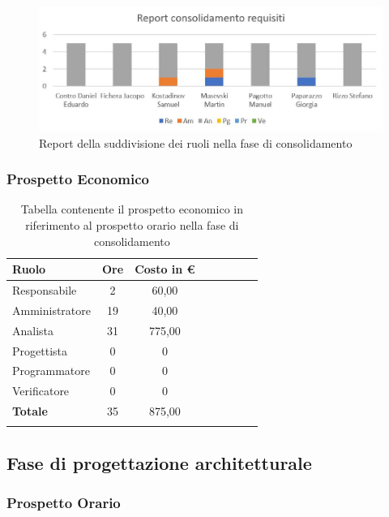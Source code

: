 \documentclass[../piano_di_progetto.tex]{subfiles}
\begin{document}
\begin{figure}[H]
\centering
\includegraphics[width=12cm]{img/report_consolidamento}
\caption{Report della suddivisione dei ruoli nella fase di consolidamento}
\end{figure}

\subsubsection{Prospetto Economico}

\begin{longtable}{|l|c|c|c|c|c|c|c|}
	\hline
	\rowcolor{lightgray}
	\textbf{Ruolo} & \textbf{Ore} & \textbf{Costo in €}\\
	\endhead
	\hline
	Responsabile & 2 & 60,00 \\
	\hline
	Amministratore & 19 & 40,00 \\
	\hline
	Analista & 31 & 775,00 \\
	\hline
	Progettista & 0 & 0 \\
	\hline
	Programmatore & 0 & 0 \\
	\hline
	Verificatore & 0 & 0 \\
	\hline
	\textbf{Totale} & 35 & 875,00 \\
	\hline
	\caption{Tabella contenente il prospetto economico in riferimento al prospetto orario nella fase di consolidamento} 
\end{longtable}


\subsection{ Fase di progettazione architetturale}%
\label{sub:fase_prog_arc}
\subsubsection{Prospetto Orario}
\end{document}
